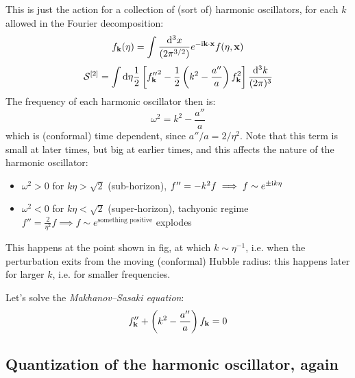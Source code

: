 This is just the action for a collection of (sort of) harmonic oscillators, for each $ k $ allowed in the Fourier decomposition:
\begin{equation*}
  f_{\mathbf{k}}(\eta) = \int \frac{\mathrm{d}^3x}{(2\pi^{3/2})} e^{- \mathrm{i} \mathbf{k} \cdot \mathbf{x}} f(\eta , \mathbf{x})
\end{equation*}
\begin{equation*}
  \mathcal{S}^{[2]} = \int \mathrm{d} \eta \frac{1}{2} \left[ {f_{\mathbf{k}}''}^2 - \frac{1}{2} \left( k^2 - \frac{a''}{a} \right) f_{\mathbf{k}}^2 \right] \frac{\mathrm{d}^3k}{(2\pi)^3}
\end{equation*}
The frequency of each harmonic oscillator then is:
\begin{equation}
  \omega^2 = k^2 - \frac{a''}{a}
\end{equation}
which is (conformal) time dependent, since $ a'' / a = 2 / \eta^2 $. Note that this term is small at later times, but big at earlier times, and this affects the nature of the harmonic oscillator:
\begin{itemize}
  \item $ \omega^2 > 0 $ for $ k \eta > \sqrt{2} $ (sub-horizon), $ f'' = - k^2 f \implies f \sim e^{\pm \mathrm{i} k \eta} $
  \item $ \omega^2 < 0 $ for $ k \eta < \sqrt{2} $ (super-horizon), tachyonic regime $ f'' = \frac{2}{\eta^2} f \implies f \sim e^{\text{something positive}} $ explodes
\end{itemize}
This happens at the point shown in fig, at which $ k \sim \eta^{-1} $, i.e. when the perturbation exits from the moving (conformal) Hubble radius: this happens later for larger $ k $, i.e. for smaller frequencies.

Let's solve the \emph{Makhanov--Sasaki equation}:
\begin{equation}
  f_{\mathbf{k}}'' + \left( k^2 - \frac{a''}{a} \right) f_{\mathbf{k}} = 0
\end{equation}

\subsection{Quantization of the harmonic oscillator, again}

